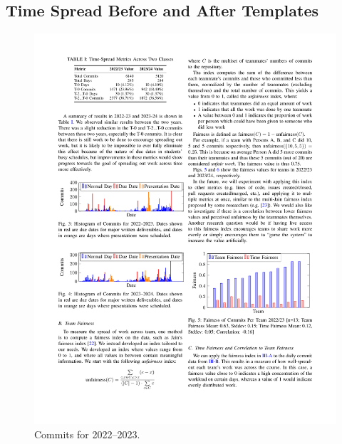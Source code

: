 \documentclass[poster, a0, plainboxedsections]{sciposter}
\begin{document}
\begin{multicols}{2}

\section{Time Spread Before and After Templates}

\begin{figure}[h!]
\centering
\includegraphics[width=0.9\linewidth]{../figures/HistCommits2022-23.pdf}
\caption{Commits for 2022--2023.}\label{Fig_22_23Timeline}
\end{figure}


\end{multicols}
\end{document}
